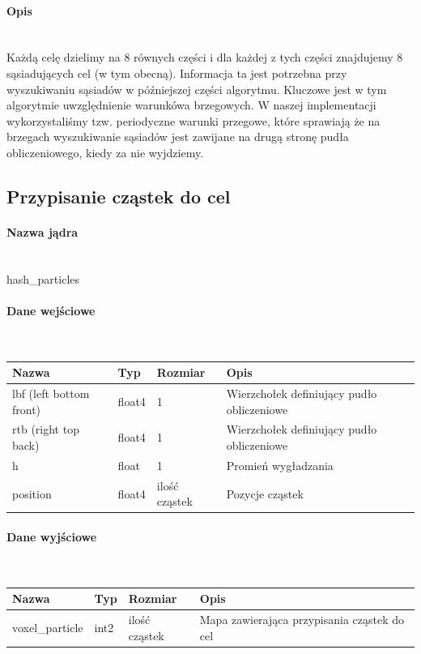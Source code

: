 \documentclass[polish, 12pt]{aghthesis}
\begin{document}
			\paragraph{Opis} \ \\
				\indent Każdą celę dzielimy na 8 równych części i dla każdej z tych części znajdujemy 8 sąsiadujących cel (w tym obecną). Informacja ta jest potrzebna przy wyszukiwaniu sąsiadów w późniejszej części algorytmu. Kluczowe jest w tym algorytmie uwzględnienie warunkówa brzegowych. W naszej implementacji wykorzystaliśmy tzw. periodyczne warunki przegowe, które sprawiają że na brzegach wyszukiwanie sąsiadów jest zawijane na drugą stronę pudła obliczeniowego, kiedy za nie wyjdziemy.
				
		\subsection{Przypisanie cząstek do cel}
			\paragraph{Nazwa jądra} \ \\
				hash\_particles
			\paragraph{Dane wejściowe} \ \\
				\begin{tabular}{| p{} | p{} | p{} | p{} |}
				\hline
					Nazwa & Typ & Rozmiar & Opis \\
				\hline
					lbf (left bottom front)& float4 & 1 & Wierzchołek definiujący pudło obliczeniowe \\ 
				\hline
					rtb (right top back) & float4 & 1 & Wierzchołek definiujący pudło obliczeniowe  \\ 
				\hline
					h & float & 1 & Promień wygładzania \\ 
				\hline
					position & float4 & ilość cząstek & Pozycje cząstek \\
				\hline
				\end{tabular}
			\paragraph{Dane wyjściowe} \ \\
				\begin{tabular}{| p{} | p{} | p{} | p{} |}
				\hline
					Nazwa & Typ & Rozmiar & Opis \\
				\hline
					voxel\_particle & int2 & ilość cząstek & Mapa zawierająca przypisania cząstek do cel \\ 
				\hline
				\end{tabular}
\end{document}
